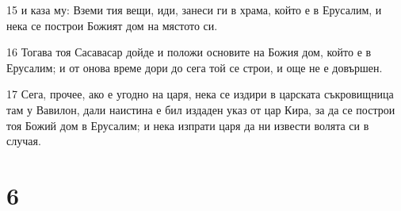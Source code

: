 \par 15 и каза му: Вземи тия вещи, иди, занеси ги в храма, който е в Ерусалим, и нека се построи Божият дом на мястото си.
\par 16 Тогава тоя Сасавасар дойде и положи основите на Божия дом, който е в Ерусалим; и от онова време дори до сега той се строи, и още не е довършен.
\par 17 Сега, прочее, ако е угодно на царя, нека се издири в царската съкровищница там у Вавилон, дали наистина е бил издаден указ от цар Кира, за да се построи тоя Божий дом в Ерусалим; и нека изпрати царя да ни извести волята си в случая.

\chapter{6}

